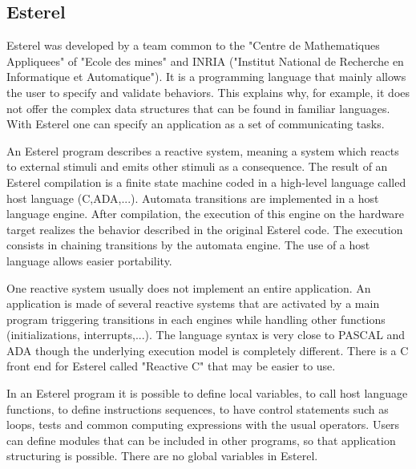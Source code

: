 \documentclass[10pt]{report}
\begin{document}
\subsection{Esterel}

Esterel was developed by a team common to the "Centre de Mathematiques Appliquees" of "Ecole des mines" and INRIA ("Institut
National de Recherche en Informatique et Automatique"). It is a programming language that mainly allows the user to specify 
and validate behaviors. This explains why, for example, it does not offer the complex data structures that can be found in familiar languages. 
With Esterel one can specify an application as a set of communicating tasks.

An Esterel program describes a reactive system, meaning a system which reacts to external stimuli and emits other
stimuli as a consequence. The result of an Esterel compilation is a finite state machine coded in a high-level language called host language (C,ADA,...).
Automata transitions are implemented in a host language engine. After compilation, the execution of this engine on the hardware target
realizes the behavior described in the original Esterel code. The execution consists in chaining transitions by the automata engine.
The use of a host language allows easier portability.

One reactive system usually does not implement an entire application. An application is made of several reactive systems that are
activated by a main program triggering transitions in each engines while handling other functions (initializations, interrupts,...).
The language syntax is very close to PASCAL and ADA though the underlying execution model is completely different. There is
a C front end for Esterel called "Reactive C" that may be easier to use.

In an Esterel program it is possible to define local variables, to call host language functions, to define instructions sequences,
to have control statements such as loops, tests and common computing expressions with the usual operators. Users can define modules
that can be included in other programs, so that application structuring is possible. There are no global variables in Esterel.
\end{document}
